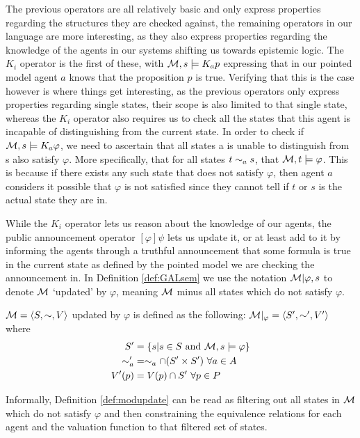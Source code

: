 The previous operators are all relatively basic and only express properties regarding the structures they are checked against, the remaining operators in our language are more interesting, as they also express properties regarding the knowledge of the agents in our systems shifting us towards epistemic logic. The $K_i$ operator is the first of these, with $\mathcal{M} ,s \models K_ap$ expressing that in our pointed model agent $a$ knows that the proposition $p$ is true. Verifying that this is the case however is where things get interesting, as the previous operators only express properties regarding single states, their scope is also limited to that single state, whereas the $K_i$ operator also requires us to check all the states that this agent is incapable of distinguishing from the current state. In order to check if $\mathcal{M},s \models K_a\varphi$, we need to ascertain that all states a is unable to distinguish from s also satisfy $\varphi$. More specifically, that for all states $t\sim_as$, that $\mathcal{M},t \models\varphi$. This is because if there exists any such state that does not satisfy $\varphi$, then agent $a$ considers it possible that $\varphi$ is not satisfied since they cannot tell if $t$ or $s$ is the actual state they are in.

While the $K_i$ operator lets us reason about the knowledge of our agents, the public announcement operator $[\varphi]\psi$ lets us update it, or at least add to it by informing the agents through a truthful announcement that some formula is true in the current state as defined by the pointed model we are checking the announcement in.
In Definition \ref{def:GALsem} we use the notation $\mathcal{M}|\varphi,s$ to denote $\mathcal{M}$ `updated' by $\varphi$, meaning $\mathcal{M}$ minus all states which do not satisfy $\varphi$.

\begin{definition}
	\label{def:modupdate}
	$\mathcal{M} = \langle S,\sim,V\rangle$ updated by $\varphi$ is defined as the following: $\mathcal{M}|_\varphi = \langle S',\sim',V'\rangle$ where 
	\begin{align*}
			S' &= \{s| s\in S\textrm{ and }\mathcal{M},s \models\varphi\} \\
			\sim_a' &= \sim_a \cap (S' \times S')~ \forall a\in A\\
			V'(p) &= V(p) \cap S'~ \forall p \in P
	\end{align*}
\end{definition}

Informally, Definition \ref{def:modupdate} can be read as filtering out all states in $\mathcal{M}$ which do not satisfy $\varphi$ and then constraining the equivalence relations for each agent and the valuation function to that filtered set of states.

